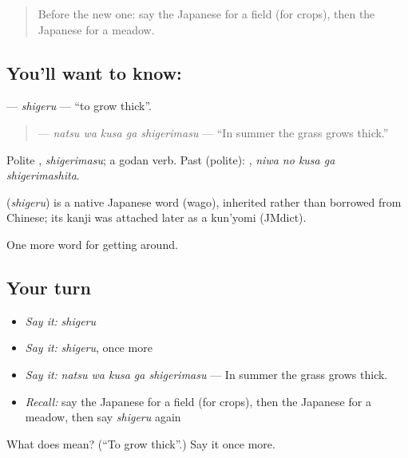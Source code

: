 \label{lesson:JA-C410-shigeru}



\begin{quote}
Before the new one: say the Japanese for a field (for crops), then the Japanese for a meadow.
\end{quote}

\subsection*{You'll want to know: }
\textbf{} — \emph{shigeru} — \textquotedblleft{}to grow thick\textquotedblright{}.

\begin{quote}
\textbf{  } — \emph{natsu wa kusa ga shigerimasu} — \textquotedblleft{}In summer the grass grows thick.\textquotedblright{}
\end{quote}

Polite \textbf{}, \emph{shigerimasu}; a godan verb. Past (polite): \textbf{  }, \emph{niwa no kusa ga shigerimashita}.

\begin{cousinweb}
\textbf{} (\emph{shigeru}) is a native Japanese word (wago), inherited rather than borrowed from Chinese; its kanji was attached later as a kun'yomi (JMdict).
\end{cousinweb}

\begin{grammarlens}[title={What you've built}]
One more word for getting around.
\end{grammarlens}

\subsection*{Your turn}
\begin{itemize}
\raggedright
  \item \emph{Say it:} \emph{shigeru}
  \item \emph{Say it:} \emph{shigeru}, once more
  \item \emph{Say it:} \emph{natsu wa kusa ga shigerimasu} — In summer the grass grows thick.
  \item \emph{Recall:} say the Japanese for a field (for crops), then the Japanese for a meadow, then say \emph{shigeru} again
\end{itemize}

\begin{tcolorbox}[breakable,colback=teal!4,colframe=teal!35!black,title={Before you move on}]
What does  mean? (\textquotedblleft{}To grow thick\textquotedblright{}.) Say it once more.
\end{tcolorbox}
